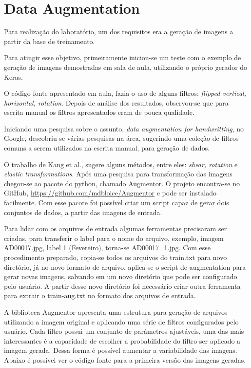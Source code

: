 \documentclass[12pt,
	english,			%
	french,				%
	spanish,			%
	brazil,				%
	]{article}
\begin{document}
\section{Data Augmentation}\label{section:data_augmented}

Para realização do laboratório, um dos requisitos era a geração de imagens a partir da base de treinamento. 

Para atingir esse objetivo, primeiramente iniciou-se um teste com o exemplo de geração de imagens demostradas em sala de aula, utilizando o próprio gerador do Keras.

O código fonte apresentado em aula, fazia o uso de alguns filtros: \textit{flipped vertical, horizontal, rotation}. Depois de análise dos resultados, observou-se que para escrita manual os filtros apresentados eram de pouca qualidade. 

Iniciando uma pesquisa sobre o assunto, \textit{data augmentation for handwritting}, no Google, descobriu-se várias pesquisas na área, sugerindo uma coleção de filtros comuns a serem utilizados na escrita manual, para geração de dados.

O trabalho de Kang et al.\cite{kang2019candidate}, sugere alguns métodos, entre eles: \textit{shear, rotation} e \textit{elastic transformations}. Após uma pesquisa para transformação das imagens chegou-se ao pacote do python, chamado Augmentor. O projeto encontra-se no GitHub, \url{https://github.com/mdbloice/Augmentor} e pode ser instalado facilmente. Com esse pacote foi possível criar um script capaz de gerar dois conjuntos de dados, a partir das imagens de entrada.

Para lidar com os arquivos de entrada algumas ferramentas precisaram ser criadas, para transferir o label para o nome do arquivo, exemplo, imagem AD00017.jpg, label 1 (Fevereiro), torna-se AD00017\_1.jpg. Com esse procedimento preparado, copia-se todos os arquivos do train.txt para novo diretório, já no novo formato de arquivo, aplica-se o script de augmentation para gerar novas imagens, salvando em um novo diretório que pode ser configurado pelo usuário. A partir desse novo diretório foi necessário criar outra ferramenta para extrair o train-aug.txt no formato dos arquivos de entrada.


A biblioteca Augmentor apresenta uma estrutura para geração de arquivos utilizando a imagem original e aplicando uma série de filtros configurados pelo usuário. Cada filtro possui um conjunto de parâmetros ajustáveis, uma das mais interessantes é a capacidade de escolher a probabilidade do filtro ser aplicado a imagem gerada. Dessa forma é possível aumentar a variabilidade das imagens. Abaixo é possível ver o código fonte para a primeira versão das imagens geradas.
\end{document}
